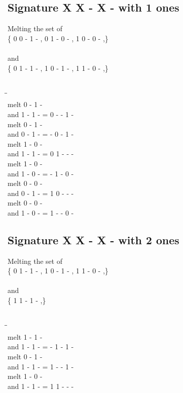 \documentclass{article}
\begin{document}
\subsection{Signature X X - X - with 1 ones}
Melting the set of\\
\{ 0  0  -  1  - , 0  1  -  0  - , 1  0  -  0  - ,\}\\\\
and\\
\{ 0  1  -  1  - , 1  0  -  1  - , 1  1  -  0  - ,\}\\\\
\begin{tabbing}
\hspace{3cm}\=\hspace{3cm}\=\hspace{3cm}\\[1cm]
melt  0  -  1  - \\
and  1  -  1  - \>
 =  0  -  -  1  - \\[1mm]
melt  0  -  1  - \\
and  0  -  1  - \>
 =  -  0  -  1  - \\[1mm]
melt  1  -  0  - \\
and  1  -  1  - \>
 =  0  1  -  -  - \\[1mm]
melt  1  -  0  - \\
and  1  -  0  - \>
 =  -  1  -  0  - \\[1mm]
melt  0  -  0  - \\
and  0  -  1  - \>
 =  1  0  -  -  - \\[1mm]
melt  0  -  0  - \\
and  1  -  0  - \>
 =  1  -  -  0  - \\[1mm]
\end{tabbing}
\newpage
\subsection{Signature X X - X - with 2 ones}
Melting the set of\\
\{ 0  1  -  1  - , 1  0  -  1  - , 1  1  -  0  - ,\}\\\\
and\\
\{ 1  1  -  1  - ,\}\\\\
\begin{tabbing}
\hspace{3cm}\=\hspace{3cm}\=\hspace{3cm}\\[1cm]
melt  1  -  1  - \\
and  1  -  1  - \>
 =  -  1  -  1  - \\[1mm]
melt  0  -  1  - \\
and  1  -  1  - \>
 =  1  -  -  1  - \\[1mm]
melt  1  -  0  - \\
and  1  -  1  - \>
 =  1  1  -  -  - \\[1mm]
\end{tabbing}
\newpage
\end{document}
